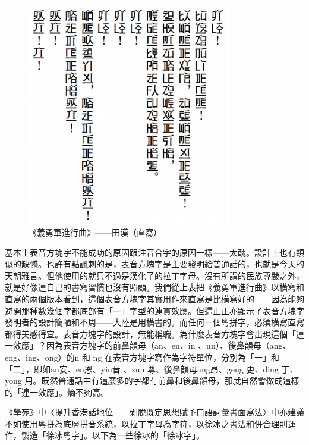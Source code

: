 \documentclass[a5paper, 12pt, openany]{book} %
\begin{document}
\begin{figure}[H]
  \centering
  \includegraphics[width=0.8\textwidth]{./images/biaoyinzi_5.png}
  \caption{《義勇軍進行曲》——田漢（直寫）}
  \label{fig:biaoyinzi_5}
\end{figure}

基本上表音方塊字不能成功的原因跟注音合字的原因一樣——太醜。設計上也有類似的缺憾。也許有點諷刺的是，表音方塊字是主要發明給普通話的，也就是今天的天朝雅言。但他使用的就只不過是漢化了的拉丁字母。沒有所謂的民族尊嚴之外，就是好像連自己的書寫習慣也沒有照顧。我們從上表把《義勇軍進行曲》以橫寫和直寫的兩個版本看到，這個表音方塊字其實用作來直寫是比橫寫好的——因為能夠避開那種數幾個字都底部有「一」字型的連貫效應。但這正正亦顯示了表音方塊字發明者的設計簡陋和不周——大陸是用橫書的。而任何一個粵拼字，必須橫寫直寫都得美感得宜。表音方塊字的設計，無能稱職。為什麼表音方塊字會出現這個「連一效應」？因為表音方塊字的前鼻韻母（an、en、in 、un）、後鼻韻母（ang、eng、ing、ong）的n 和 ng 在表音方塊字寫作為字符單位，分別為「一」和「二」，即如an安、en恩、yin音 、zun 尊、後鼻韻母ang昂、geng 更、ding 丁、yong 用。既然普通話中有這麼多的字都有前鼻和後鼻韻母，那就自然會做成這樣的「連一效應」。熵不夠高。

《學苑》中〈提升香港話地位——剝脫既定思想賦予口語詞彙書面寫法〉中亦建議不如使用粵拼為底層拼音系統，以拉丁字母為字符，以徐冰之書法和併合理則運作，製造「徐冰粵字」。以下為一些徐冰的「徐冰字」。
\end{document}
